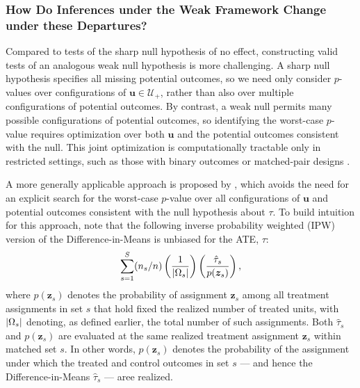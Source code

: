 \documentclass[
  12pt,
  leqno]{article}
\DeclarePairedDelimiter\abs{\lvert}{\rvert}
\begin{document}
\subsubsection{How Do Inferences under the Weak Framework Change under
these
Departures?}\label{how-do-inferences-under-the-weak-framework-change-under-these-departures}

Compared to tests of the sharp null hypothesis of no effect,
constructing valid tests of an analogous weak null hypothesis is more
challenging. A sharp null hypothesis specifies all missing potential
outcomes, so we need only consider \(p\)-values over configurations of
\(\bm{u} \in \mathcal{U}_{+}\), rather than also over multiple
configurations of potential outcomes. By contrast, a weak null permits
many possible configurations of potential outcomes, so identifying the
worst-case \(p\)-value requires optimization over both \(\bm{u}\) and
the potential outcomes consistent with the null. This joint optimization
is computationally tractable only in restricted settings, such as those
with binary outcomes \citep{fogartyetal2017} or matched-pair designs
\citep{fogarty2020}.

A more generally applicable approach is proposed by \citet{fogarty2023},
which avoids the need for an explicit search for the worst-case
\(p\)-value over all configurations of \(\bm{u}\) and potential outcomes
consistent with the null hypothesis about \(\tau\). To build intuition
for this approach, note that the following inverse probability weighted
(IPW) version of the Difference-in-Means is unbiased for the ATE,
\(\tau\): \begin{align} \label{eq: weighted diff-in-means}
\sum \limits_{s = 1}^S (n_s/n) \left(\frac{1}{\abs{\Omega_s}}\right)\left(\frac{\hat{\tau}_s}{p(\bm{z}_s)}\right),
\end{align} where \(p(\bm{z}_s)\) denotes the probability of assignment
\(\bm{z}_s\) among all treatment assignments in set \(s\) that hold
fixed the realized number of treated units, with \(\abs{\Omega_s}\)
denoting, as defined earlier, the total number of such assignments. Both
\(\hat{\tau}_s\) and \(p(\bm{z}_s)\) are evaluated at the same realized
treatment assignment \(\bm{z}_s\) within matched set \(s\). In other
words, \(p(\bm{z}_s)\) denotes the probability of the assignment under
which the treated and control outcomes in set \(s\) --- and hence the
Difference-in-Means \(\hat{\tau}_s\) --- aree realized.
\end{document}
